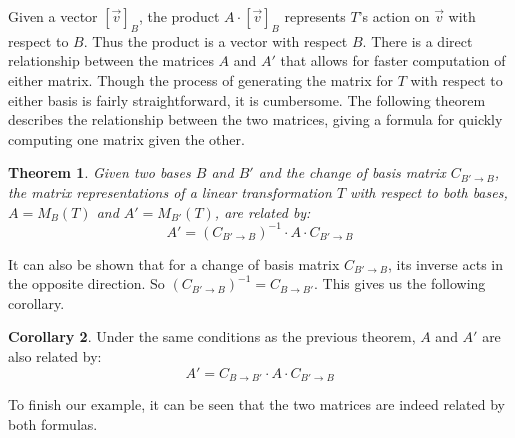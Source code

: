 \documentclass[11pt]{amsart}
\newtheorem{theorem}{Theorem}[section]
\theoremstyle{definition}
\newtheorem{corollary}[theorem]{Corollary}
\begin{document}
Given a vector $[ \vec{v} ]_B$, the product $A \cdot [ \vec{v} ]_B$ represents $T$'s action on $\vec{v}$ with respect to $B$. Thus the product is a
vector with respect $B$. There is a direct relationship between the matrices $A$ and $A'$ that allows for faster computation of either matrix.
Though the process of generating the matrix for $T$ with respect to either basis is fairly straightforward, it is cumbersome. The following 
theorem describes the relationship between the two matrices, giving a formula for quickly computing one matrix given the other.
\begin{theorem}
	Given two bases $B$ and $B'$ and the change of basis matrix $C_{B' \rightarrow B}$, the matrix representations of a linear transformation
	$T$ with respect to both bases, $A = M_B(T)$ and $A' = M_{B'}(T)$, are related by:
	\[
		A' = (C_{B' \rightarrow B})^{-1} \cdot A \cdot C_{B' \rightarrow B}
	\]
\end{theorem}
It can also be shown that for a change of basis matrix $C_{B' \rightarrow B}$, its inverse acts in the opposite direction. So 
$(C_{B' \rightarrow B})^{-1} = C_{B \rightarrow B'}$. This gives us the following corollary.
\begin{corollary}
	Under the same conditions as the previous theorem, $A$ and $A'$ are also related by:
	\[
		A' = C_{B \rightarrow B'} \cdot A \cdot C_{B' \rightarrow B}
	\]
\end{corollary}
To finish our example, it can be seen that the two matrices are indeed related by both formulas.

\newpage
\end{document}
